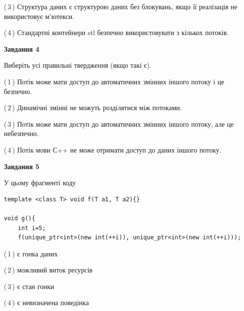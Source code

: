 \documentclass[12pt, ukrainian]{article}
\begin{document}
\begin {large}
{(\,3\,) Структура даних є структурою даних без блокувань, якщо її реалізація не використовує м’ютекси.%

(\,4\,) Стандартні контейнери stl безпечно використовувати з кількох потоків.%



\begin{center}
\textbf{Завдання 4}
\end{center}
Виберіть усі правильні твердження (якщо такі є).\par
\vspace{2mm}

(\,1\,) Потік може мати доступ до автоматичних змінних іншого потоку і це безпечно.%

(\,2\,) Динамічні змінні не можуть розділятися між потоками.%

(\,3\,) Потік може мати доступ до автоматичних змінних іншого потоку, але це небезпечно.%

(\,4\,) Потік мови С++ не може отримати доступ до даних іншого потоку.%



\begin{center}
\textbf{Завдання 5}
\end{center}
У цьому фрагменті коду
\begin{verbatim}
template <class T> void f(T a1, T a2){}

void g(){
    int i=5;
    f(unique_ptr<int>(new int(++i)), unique_ptr<int>(new int(++i)));
\end{verbatim}

(\,1\,) є гонка даних%

(\,2\,) можливий виток ресурсів%

(\,3\,) є стан гонки%

(\,4\,) є невизначена поведінка%


}
\end {large}
\end{document}
